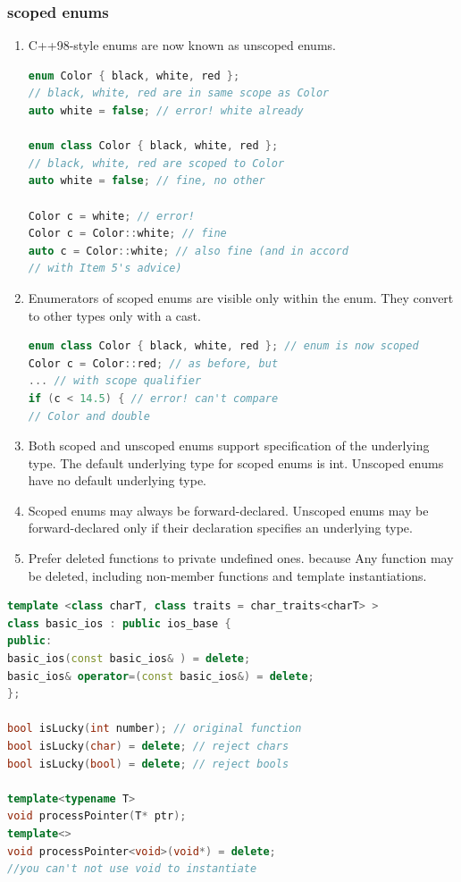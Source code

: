 \documentclass[a4paper,12pt,twoside]{book}
\begin{document}
\subsubsection{scoped enums}
\begin{enumerate}
\item C++98-style enums are now known as unscoped enums.
\begin{lstlisting}[frame=single, language=c++]
enum Color { black, white, red };
// black, white, red are in same scope as Color
auto white = false; // error! white already

enum class Color { black, white, red };
// black, white, red are scoped to Color
auto white = false; // fine, no other

Color c = white; // error!
Color c = Color::white; // fine
auto c = Color::white; // also fine (and in accord
// with Item 5's advice)
\end{lstlisting}

\item Enumerators of scoped enums are visible only within the enum. They convert
to other types only with a cast.
\begin{lstlisting}[frame=single, language=c++]
enum class Color { black, white, red }; // enum is now scoped
Color c = Color::red; // as before, but
... // with scope qualifier
if (c < 14.5) { // error! can't compare
// Color and double
\end{lstlisting}
\item Both scoped and unscoped enums support specification of the underlying type.
The default underlying type for scoped enums is int. Unscoped enums have no
default underlying type.

\item Scoped enums may always be forward-declared. Unscoped enums may be
forward-declared only if their declaration specifies an underlying type.

\item Prefer deleted functions to private undefined ones. because Any function may be deleted, including non-member functions and template instantiations.
\end{enumerate}






\begin{lstlisting}[frame=single, language=c++]
template <class charT, class traits = char_traits<charT> >
class basic_ios : public ios_base {
public:
basic_ios(const basic_ios& ) = delete;
basic_ios& operator=(const basic_ios&) = delete;
};

bool isLucky(int number); // original function
bool isLucky(char) = delete; // reject chars
bool isLucky(bool) = delete; // reject bools

template<typename T>
void processPointer(T* ptr);
template<>
void processPointer<void>(void*) = delete;
//you can't not use void to instantiate
\end{lstlisting} 
\end{document}

